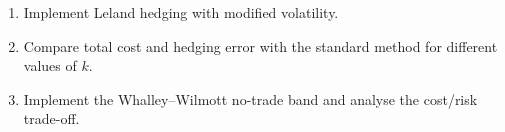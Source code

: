 \begin{exercise}
\begin{enumerate}
    \item Implement Leland hedging with modified volatility.
    \item Compare total cost and hedging error with the standard method
          for different values of $k$.
    \item Implement the Whalley--Wilmott no-trade band and analyse the
          cost/risk trade-off.
\end{enumerate}
\end{exercise}
